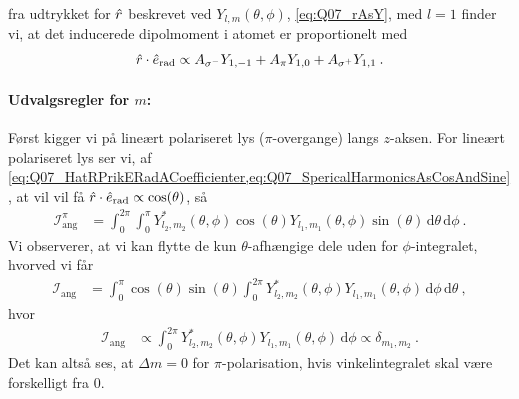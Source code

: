 fra udtrykket for $\Hat{r}$ beskrevet ved $Y_{l,m}(\theta,\phi)$, \cref{eq:Q07_rAsY}, med $l=1$ finder vi, at det inducerede dipolmoment i atomet er proportionelt med
\begin{align} \label{eq:Q07_HatRPrikERadACoefficienter}
    \Hat{r} \cdot \Hat{e}_\text{rad} \propto A_{\sigma^-} Y_{1,-1} + A_\pi Y_{1,0} + A_{\sigma^+} Y_{1,1} \: .
\end{align}


\paragraph{Udvalgsregler for $m$:} Først kigger vi på \textsf{lineært polariseret lys} ($\pi$-overgange) langs $z$-aksen. For lineært polariseret lys ser vi, af \cref{eq:Q07_HatRPrikERadACoefficienter,eq:Q07_SpericalHarmonicsAsCosAndSine}, at vil vil få $\Hat{r}\cdot\Hat{e}_\text{rad} \propto \cos(\theta)$, så
\begin{align}
    \mathcal{I}_\text{ang}^\pi &= \int_0^{2\pi}\int_0^\pi Y_{l_2,m_2}^*(\theta,\phi) \cos(\theta) Y_{l_1,m_1}(\theta,\phi) \sin(\theta) \, \text{d}\theta \, \text{d}\phi \: .
\end{align}
Vi observerer, at vi kan flytte de kun $\theta$-afhængige dele uden for $\phi$-integralet, hvorved vi får
\begin{align}
    \mathcal{I}_\text{ang} &= \int_0^\pi \cos(\theta)\sin(\theta) \int_0^{2\pi} Y_{l_2,m_2}^*(\theta,\phi) Y_{l_1,m_1}(\theta,\phi) \, \text{d}\phi \, \text{d}\theta \: ,
\end{align}
hvor
\begin{align}
    \mathcal{I}_\text{ang} &\propto \int_0^{2\pi} Y_{l_2,m_2}^*(\theta,\phi) Y_{l_1,m_1}(\theta,\phi) \, \text{d}\phi \propto \delta_{m_1,m_2} \: .
\end{align}
Det kan altså ses, at $\Delta m = 0$ for $\pi$-polarisation, hvis vinkelintegralet skal være forskelligt fra 0.\\

